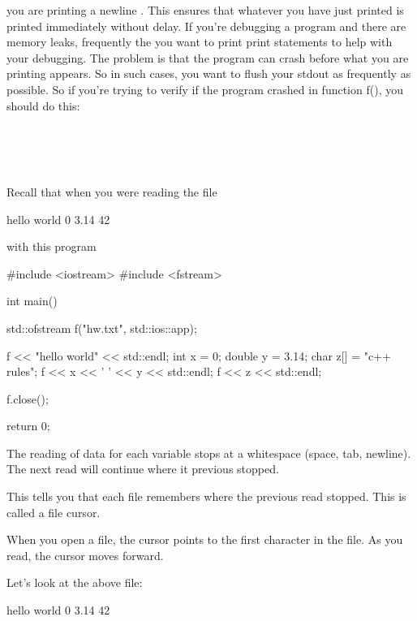 \begin{consolethree}[escapeinside=||]
you are printing a newline . This ensures that whatever you have just printed is printed immediately without delay. If you're debugging a program and there are memory leaks, frequently the you want to print print statements to help with your debugging. The problem is that the program can crash before what you are printing appears. So in such cases, you want to flush your stdout as frequently as possible. So if you're trying to verify if the program crashed in function f(), you should do this:

\\
\\
\\

\newpage{}

Recall that when you were reading the file

\begin{console}
hello world
0 3.14
42
\end{console}

with this program

\begin{console}
#include <iostream>
#include <fstream>

int main()
{   
    std::ofstream f("hw.txt", std::ios::app);

    f << "hello world" << std::endl;
    int x = 0;
    double y = 3.14;
    char z[] = "c++ rules";
    f << x << ' ' << y << std::endl;
    f << z << std::endl;

    f.close();

    return 0;
}
\end{console}

The reading of data for each variable stops at a whitespace (space, tab, newline). The next read will continue where it previous stopped.

This tells you that each file remembers where the previous read stopped. This is called a file cursor.

When you open a file, the cursor points to the first character in the file. As you read, the cursor moves forward.

Let's look at the above file:

\begin{console}
hello world
0 3.14
42 
\end{console}


\end{consolethree}
